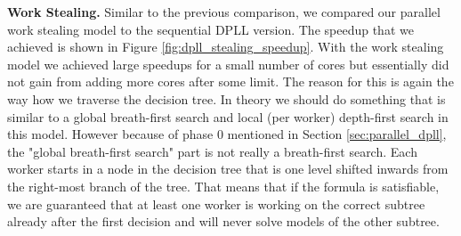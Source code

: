 \documentclass[letterpaper]{article}
\newcommand{\mypar}[1]{{\bf #1.}}
\begin{document}
\mypar{Work Stealing}
Similar to the previous comparison, we compared our parallel work stealing model to the sequential DPLL version.
The speedup that we achieved is shown in Figure \ref{fig:dpll_stealing_speedup}.
With the work stealing model we achieved large speedups for a small number of cores but essentially did not gain from adding more cores after some limit.
The reason for this is again the way how we traverse the decision tree.
In theory we should do something that is similar to a global breath-first search and local (per worker) depth-first search in this model.
However because of phase 0 mentioned in Section \ref{sec:parallel_dpll}, the "global breath-first search" part is not really a breath-first search.
Each worker starts in a node in the decision tree that is one level shifted inwards from the right-most branch of the tree.
That means that if the formula is satisfiable, we are guaranteed that at least one worker is working on the correct subtree already after the first decision and will never solve models of the other subtree.
\end{document}
